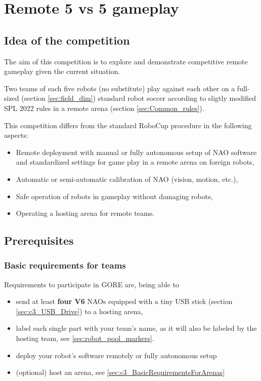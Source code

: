 \section{Remote 5 vs 5 gameplay}
\label{sec:OneVsOneChallenge}

\subsection{Idea of the competition}
The aim of this competition is to explore and demonstrate  competitive remote gameplay given the current situation.

Two teams of each five robots (no substitute) play against each other on a full-sized (\cf section \ref{sec:field_dim}) standard robot soccer according to sligtly modified SPL 2022 rules in a remote arena (\cf section \ref{sec:Common_rules}). 

This competition differs from the standard RoboCup procedure in the following aspects:
\begin{itemize}
    \item Remote deployment with manual or fully autonomous setup of NAO software and standardized settings for game play in a remote arena on foreign robots,
    \item Automatic or semi-automatic calibration of NAO (vision, motion, etc.), 
    \item Safe operation of robots in gameplay without damaging robots,
    \item Operating a hosting arena for remote teams. 
\end{itemize}

\subsection{Prerequisites}
\label{sec:c3_Prerequisites}

\subsubsection{Basic requirements for teams}

Requirements to participate in GORE are, being able to
\begin{itemize}
    \item send at least \textbf{four V6} NAOs equipped with a tiny USB stick (\cf section \ref{sec:c3_USB_Drive}) to a hosting arena,
    \item label each single part with your team's name, as it will also be labeled by the hosting team, see \ref{sec:robot_pool_markers}.
	\item deploy your robot's software remotely or fully autonomous setup
	\item (optional) host an arena, see \ref{sec:c3_BasicRequirementsForArenas}
\end{itemize}

